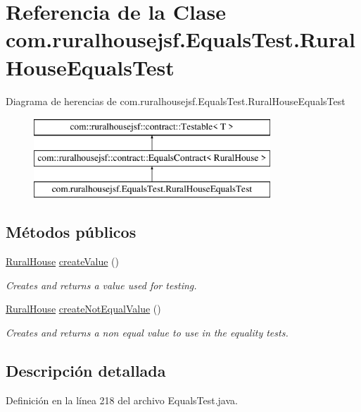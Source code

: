 \hypertarget{a00256}{}\section{Referencia de la Clase com.\+ruralhousejsf.\+Equals\+Test.\+Rural\+House\+Equals\+Test}
\label{a00256}
Diagrama de herencias de com.\+ruralhousejsf.\+Equals\+Test.\+Rural\+House\+Equals\+Test\begin{figure}[H]
\begin{center}
\leavevmode
\includegraphics[height=3.000000cm]{a00256}
\end{center}
\end{figure}
\subsection*{Métodos públicos}
\begin{DoxyCompactItemize}
\item 
\mbox{\hyperlink{a00188}{Rural\+House}} \mbox{\hyperlink{a00256_abcab55b3e63c8d5511f04e395ff0f111}{create\+Value}} ()
\begin{DoxyCompactList}\small\item\em Creates and returns a value used for testing. \end{DoxyCompactList}\item 
\mbox{\hyperlink{a00188}{Rural\+House}} \mbox{\hyperlink{a00256_a4021dc1a2dacaed55fa5bacec7ca6165}{create\+Not\+Equal\+Value}} ()
\begin{DoxyCompactList}\small\item\em Creates and returns a non equal value to use in the equality tests. \end{DoxyCompactList}\end{DoxyCompactItemize}


\subsection{Descripción detallada}


Definición en la línea 218 del archivo Equals\+Test.\+java.



